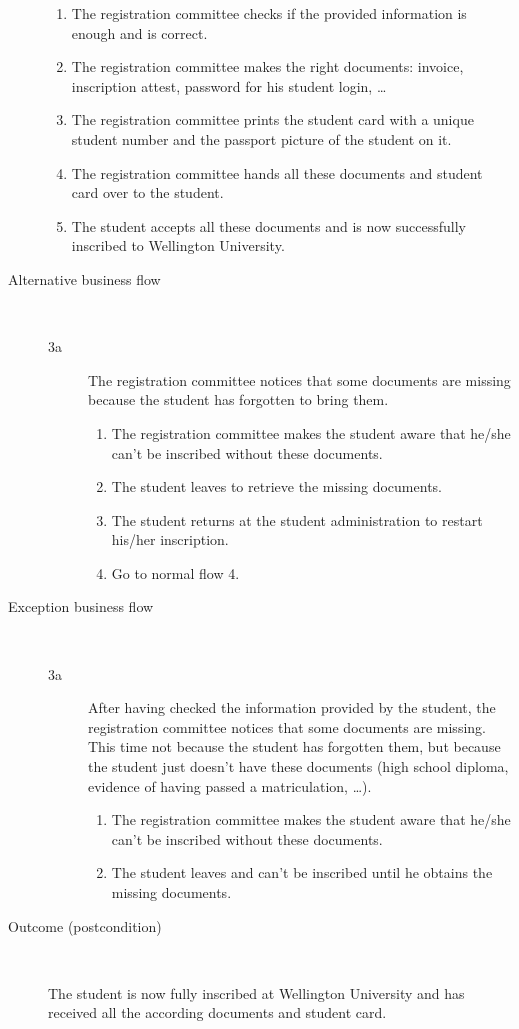 \begin{description}
\begin{enumerate}
	  	\item The registration committee checks if the provided information is enough
	  	and is correct.
	  	\item The registration committee makes the right documents: invoice,
	  	inscription attest, password for his student login, \ldots
	  	\item The registration committee prints the student card with a unique
	  	student number and the passport picture of the student on it.
	  	\item The registration committee hands all these documents and student card
	  	over to the student.
	  	\item The student accepts all these documents and is now successfully
	  	inscribed to Wellington University.
	\end{enumerate}
	\item[Alternative business flow] \ 
	\begin{description}
  		\item[3a] The registration committee notices that some documents are missing
  		because the student has forgotten to bring them.
  		\begin{enumerate}
  			\item The registration committee makes the student aware that he/she
  			can't be inscribed without these documents.
  			\item The student leaves to retrieve the missing documents.
  			\item The student returns at the student administration to restart his/her
  			inscription.
  			\item Go to normal flow 4.
		\end{enumerate}
	\end{description}
	\item[Exception business flow] \
	\begin{description}
		\item[3a] After having checked the information provided by the student, the
		registration committee notices that some documents are missing. This time not
		because the student has forgotten them, but because the student just doesn't
		have these documents (high school diploma, evidence of having passed a
		matriculation, \ldots).
		\begin{enumerate}
		  \item The registration committee makes the student aware that he/she can't be
		  inscribed without these documents.
		  \item The student leaves and can't be inscribed until he obtains the missing
		  documents.
		\end{enumerate}
	\end{description}
	\item[Outcome (postcondition)] \
	\par The student is now fully inscribed at Wellington University and has
	received all the according documents and student card.
\end{description}
